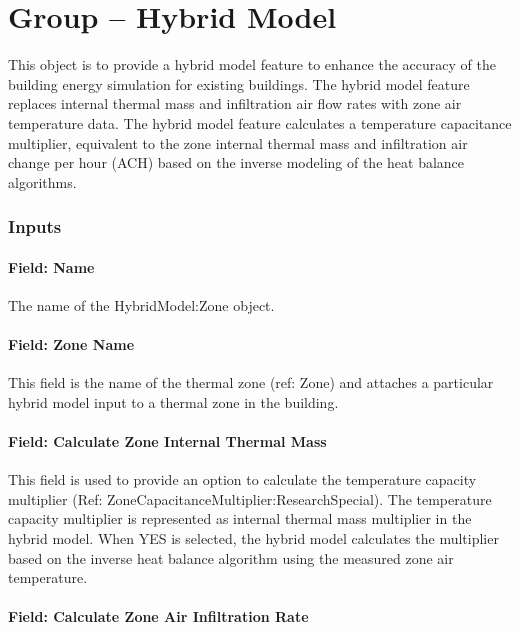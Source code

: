 \section{Group -- Hybrid Model}\label{group-hybrid-model}

This object is to provide a hybrid model feature to enhance the accuracy of the building energy simulation for existing buildings. The hybrid model feature replaces internal thermal mass and infiltration air flow rates with zone air temperature data. The hybrid model feature calculates a temperature capacitance multiplier, equivalent to the zone internal thermal mass and infiltration air change per hour (ACH) based on the inverse modeling of the heat balance algorithms. 

\subsubsection{Inputs}\label{inputs-hm}

\paragraph{Field: Name}\label{field-name-hm}

The name of the HybridModel:Zone object.

\paragraph{Field: Zone Name}\label{field-zone-name-hm}

This field is the name of the thermal zone (ref: Zone) and attaches a particular hybrid model input to a thermal zone in the building.

\paragraph{Field: Calculate Zone Internal Thermal Mass}\label{field-calculate-zon-internal-thermal-mass-hm}

This field is used to provide an option to calculate the temperature capacity multiplier (Ref: ZoneCapacitanceMultiplier:ResearchSpecial). The temperature capacity multiplier is represented as internal thermal mass multiplier in the hybrid model. 
When YES is selected, the hybrid model calculates the multiplier based on the inverse heat balance algorithm using the measured zone air temperature.

\paragraph{Field: Calculate Zone Air Infiltration Rate}\label{field-calculate-zone-air-fnfiltration-rate-hm}

